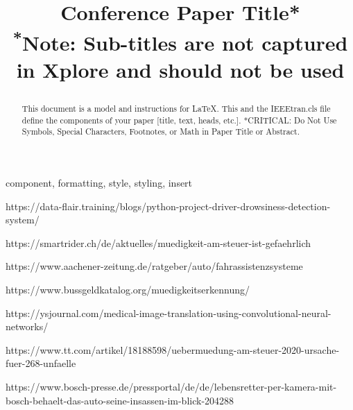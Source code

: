 \documentclass[conference]{IEEEtran}
\begin{document}
\lstset{frame=lines}
\lstset{basicstyle=\footnotesize}


\title{Conference Paper Title*\\
{\footnotesize \textsuperscript{*}Note: Sub-titles are not captured in Xplore and
should not be used}

}

\author{
}

\maketitle

\begin{abstract}
This document is a model and instructions for \LaTeX.
This and the IEEEtran.cls file define the components of your paper [title, text, heads, etc.]. *CRITICAL: Do Not Use Symbols, Special Characters, Footnotes, 
or Math in Paper Title or Abstract.
\end{abstract}

\begin{IEEEkeywords}
component, formatting, style, styling, insert
\end{IEEEkeywords}







\newpage




\begin{thebibliography}{00}

 https://data-flair.training/blogs/python-project-driver-drowsiness-detection-system/

 https://smartrider.ch/de/aktuelles/muedigkeit-am-steuer-ist-gefaehrlich

 https://www.aachener-zeitung.de/ratgeber/auto/fahrassistenzsysteme

 https://www.bussgeldkatalog.org/muedigkeitserkennung/

 https://ysjournal.com/medical-image-translation-using-convolutional-neural-networks/

 https://www.tt.com/artikel/18188598/uebermuedung-am-steuer-2020-ursache-fuer-268-unfaelle

 https://www.bosch-presse.de/pressportal/de/de/lebensretter-per-kamera-mit-bosch-behaelt-das-auto-seine-insassen-im-blick-204288


\end{thebibliography}
\vspace{12pt}
\end{document}
